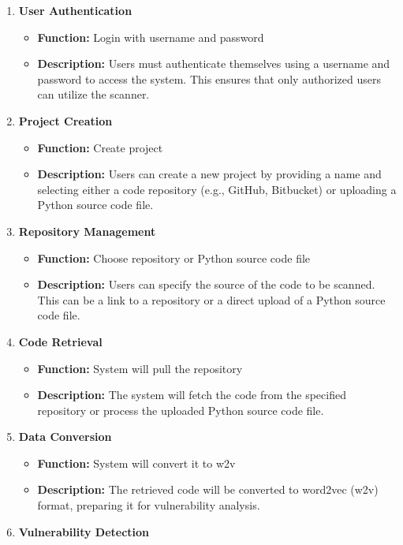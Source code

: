\begin{enumerate}
    \item \textbf{User Authentication}
    \begin{itemize}
        \item \textbf{Function:} Login with username and password
        \item \textbf{Description:} Users must authenticate themselves using a username and password to access the system. This ensures that only authorized users can utilize the scanner.
    \end{itemize}
    \item \textbf{Project Creation}
    \begin{itemize}
        \item \textbf{Function:} Create project
        \item \textbf{Description:} Users can create a new project by providing a name and selecting either a code repository (e.g., GitHub, Bitbucket) or uploading a Python source code file.
    \end{itemize}
    \item \textbf{Repository Management}
    \begin{itemize}
        \item \textbf{Function:} Choose repository or Python source code file
        \item \textbf{Description:} Users can specify the source of the code to be scanned. This can be a link to a repository or a direct upload of a Python source code file.
    \end{itemize}
    \item \textbf{Code Retrieval}
    \begin{itemize}
        \item \textbf{Function:} System will pull the repository
        \item \textbf{Description:} The system will fetch the code from the specified repository or process the uploaded Python source code file.
    \end{itemize}
    \item \textbf{Data Conversion}
    \begin{itemize}
        \item \textbf{Function:} System will convert it to w2v
        \item \textbf{Description:} The retrieved code will be converted to word2vec (w2v) format, preparing it for vulnerability analysis.
    \end{itemize}
    \item \textbf{Vulnerability Detection}

\end{enumerate}
